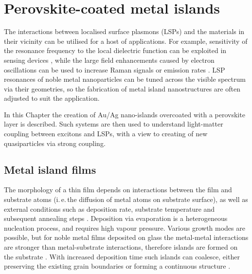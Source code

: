 
\chapter{Perovskite-coated metal islands}

\graphicspath{{Chapter6/Figures/}}

The interactions between localised surface plasmons (LSPs) and the materials in their vicinity can be utilised for a host of applications. For example, sensitivity of the resonance frequency to the local dielectric function can be exploited in sensing devices \cite{Jensen2000, Xu2004, Malinsky2001, Royer1987}, while the large field enhancements caused by electron oscillations can be used to increase Raman signals \cite{Cade2009, Olson2001, Talley2005} or emission rates \cite{Toftegaard2011, Cho2010, Reboud2013, Blanco2004}. LSP resonances of noble metal nanoparticles can be tuned across the visible spectrum via their geometries, so the fabrication of metal island nanostructures are often adjusted to suit the application.

In this Chapter the creation of Au/Ag nano-islands overcoated with a perovskite layer is described. Such systems are then used to understand light-matter coupling between excitons and LSPs, with a view to creating of new quasiparticles via strong coupling.

\section{Metal island films}
The morphology of a thin film depends on interactions between the film and substrate atoms (i.\,e.\,the diffusion of metal atoms on substrate surface), as well as external conditions such as deposition rate, substrate temperature and subsequent annealing steps \cite{Kaiser2002}. Deposition via evaporation is a heterogeneous nucleation process, and requires high vapour pressure. Various growth modes are possible, but for noble metal films deposited on glass the metal-metal interactions are stronger than metal-substrate interactions, therefore islands are formed on the substrate \cite{Kaiser2002}. With increased deposition time such islands can coalesce, either preserving the existing grain boundaries or forming a continuous structure \cite{Sennett1950,Gupta2002}.

